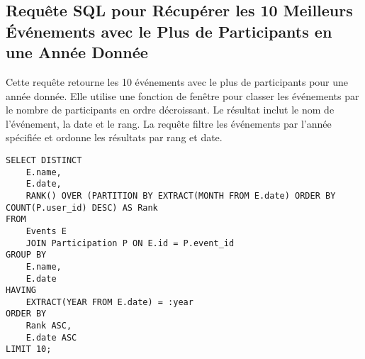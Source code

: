 \subsection{Requête SQL pour Récupérer les 10 Meilleurs Événements avec le Plus de Participants en une Année Donnée}

Cette requête retourne les 10 événements avec le plus de participants pour une année donnée. Elle utilise une fonction de fenêtre pour classer les événements par le nombre de participants en ordre décroissant. Le résultat inclut le nom de l'événement, la date et le rang. La requête filtre les événements par l'année spécifiée et ordonne les résultats par rang et date.

\begin{lstlisting}
SELECT DISTINCT
    E.name,
    E.date,
    RANK() OVER (PARTITION BY EXTRACT(MONTH FROM E.date) ORDER BY COUNT(P.user_id) DESC) AS Rank
FROM
    Events E
    JOIN Participation P ON E.id = P.event_id
GROUP BY
    E.name,
    E.date
HAVING
    EXTRACT(YEAR FROM E.date) = :year
ORDER BY
    Rank ASC,
    E.date ASC
LIMIT 10;
\end{lstlisting}